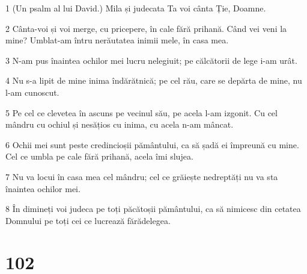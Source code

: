 \par 1 (Un psalm al lui David.) Mila și judecata Ta voi cânta Ție, Doamne.
\par 2 Cânta-voi și voi merge, cu pricepere, în cale fără prihană. Când vei veni la mine? Umblat-am întru nerăutatea inimii mele, în casa mea.
\par 3 N-am pus înaintea ochilor mei lucru nelegiuit; pe călcătorii de lege i-am urât.
\par 4 Nu s-a lipit de mine inima îndărătnică; pe cel rău, care se depărta de mine, nu l-am cunoscut.
\par 5 Pe cel ce clevetea în ascuns pe vecinul său, pe acela l-am izgonit. Cu cel mândru cu ochiul și nesățios cu inima, cu acela n-am mâncat.
\par 6 Ochii mei sunt peste credincioșii pământului, ca să șadă ei împreună cu mine. Cel ce umbla pe cale fără prihană, acela îmi slujea.
\par 7 Nu va locui în casa mea cel mândru; cel ce grăiește nedreptăți nu va sta înaintea ochilor mei.
\par 8 În dimineți voi judeca pe toți păcătoșii pământului, ca să nimicesc din cetatea Domnului pe toți cei ce lucrează fărădelegea.

\chapter{102}

